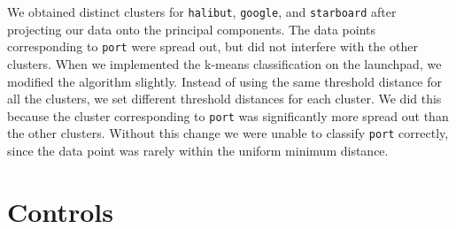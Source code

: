 \documentclass[12pt]{article}
\newcommand{\port}{\texttt{port}}
\newcommand{\google}{\texttt{google}}
\newcommand{\starboard}{\texttt{starboard}}
\newcommand{\halibut}{\texttt{halibut}}
\begin{document}
We obtained distinct clusters for {\halibut}, {\google}, and {\starboard}
after projecting our data onto the principal components.  The data points
corresponding to {\port} were spread out, but did not interfere with the other
clusters. When we implemented the k-means classification on the
launchpad, we modified the algorithm slightly. Instead of using the same
threshold distance for all the clusters, we set different threshold distances
for each cluster. We did this because the cluster corresponding to {\port} was
significantly more spread out than the other clusters. Without this change we
were unable to classify {\port} correctly, since the data point was rarely
within the uniform minimum distance.

\section*{Controls}
\end{document}
